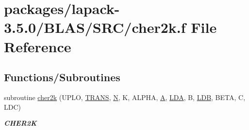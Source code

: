 \hypertarget{lapack-3_85_80_2BLAS_2SRC_2cher2k_8f}{}\section{packages/lapack-\/3.5.0/\+B\+L\+A\+S/\+S\+R\+C/cher2k.f File Reference}
\label{lapack-3_85_80_2BLAS_2SRC_2cher2k_8f}
\subsection*{Functions/\+Subroutines}
\begin{DoxyCompactItemize}
\item 
subroutine \hyperlink{group__complex__blas__level3_gaf5266b622e0fbbd972cfc2df3061984f}{cher2k} (U\+P\+L\+O, \hyperlink{superlu__enum__consts_8h_a0c4e17b2d5cea33f9991ccc6a6678d62a1f61e3015bfe0f0c2c3fda4c5a0cdf58}{T\+R\+A\+N\+S}, \hyperlink{polmisc_8c_a0240ac851181b84ac374872dc5434ee4}{N}, K, A\+L\+P\+H\+A, \hyperlink{classA}{A}, \hyperlink{example__user_8c_ae946da542ce0db94dced19b2ecefd1aa}{L\+D\+A}, B, \hyperlink{example__user_8c_a50e90a7104df172b5a89a06c47fcca04}{L\+D\+B}, B\+E\+T\+A, C, L\+D\+C)
\begin{DoxyCompactList}\small\item\em {\bfseries C\+H\+E\+R2\+K} \end{DoxyCompactList}\end{DoxyCompactItemize}
